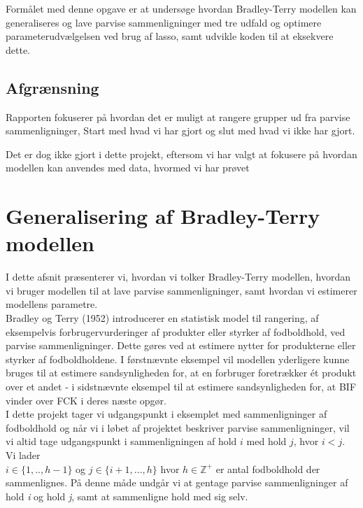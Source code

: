 \documentclass[11pt,a4paper]{article}
\begin{document}
Formålet med denne opgave er at undersøge hvordan Bradley-Terry modellen kan generaliseres og lave parvise sammenligninger med tre udfald og optimere parameterudvælgelsen ved brug af lasso, samt udvikle koden til at eksekvere dette. 
\subsection{Afgrænsning}
Rapporten fokuserer på hvordan det er muligt at rangere grupper ud fra parvise sammenligninger, 
Start med hvad vi har gjort og slut med hvad vi ikke har gjort. 

Det er dog ikke gjort i dette projekt, eftersom vi har valgt at fokusere på hvordan modellen kan anvendes med data, hvormed vi har prøvet
\section{Generalisering af Bradley-Terry modellen}
I dette afsnit præsenterer vi, hvordan vi tolker Bradley-Terry modellen, hvordan vi bruger modellen til at lave parvise sammenligninger, samt hvordan vi estimerer modellens parametre.\\ \newline
Bradley og Terry (1952)\cite{BradleyTerry} introducerer en statistisk model til rangering, af eksempelvis forbrugervurderinger af produkter eller styrker af fodboldhold, ved parvise sammenligninger. Dette gøres ved at estimere nytter for produkterne eller styrker af fodboldholdene. I førstnævnte eksempel vil modellen yderligere kunne bruges til at estimere sandsynligheden for, at en forbruger foretrækker ét produkt over et andet - i sidstnævnte eksempel til at estimere sandsynligheden for, at BIF vinder over FCK i deres næste opgør.\\ I dette projekt tager vi udgangspunkt i eksemplet med sammenligninger af fodboldhold og når vi i løbet af projektet beskriver parvise sammenligninger, vil vi altid tage udgangspunkt i sammenligningen af hold $i$ med hold $j$, hvor $i<j$. Vi lader \\$i \in \{1,..,h-1\}$ og $j\in \{i+1,...,h\}$ hvor $h\in \mathbb{Z}^+$ er antal fodboldhold der sammenlignes. På denne måde undgår vi at gentage parvise sammenligninger af hold \textit{i} og hold \textit{j}, samt at sammenligne hold med sig selv. 
\end{document}
